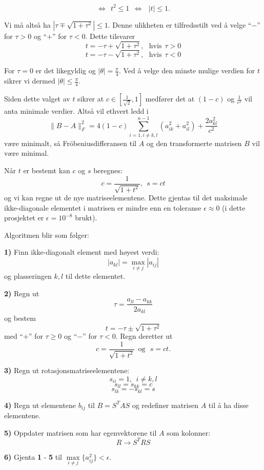 \documentclass[norsk, 12pt]{article}
\newcommand{\f}{\frac}
\begin{document}
$$\Leftrightarrow \ \ t^2\leq 1\ \  \Leftrightarrow\ \ \ |t|\leq1.$$

Vi må altså ha $|\tau\mp\sqrt{1+\tau^2}|\leq1$. Denne ulikheten er tilfredsstilt ved å velge ``$-$'' for $\tau>0$ og ``$+$'' for $\tau<0$.
Dette tilsvarer
$$t = -\tau + \sqrt{1+\tau^2},\ \ \ \text{hvis}\ \ \tau>0$$
$$t = -\tau - \sqrt{1+\tau^2},\ \ \ \text{hvis}\ \ \tau<0$$

For $\tau=0$ er det likegyldig og
$|\theta|= \f{\pi}{4}$. Ved å velge den minste mulige verdien for $t$ sikrer vi dermed $|\theta|\leq\f{\pi}{4}$.

Siden dette valget av $t$ sikrer at $c\in\left[\f{1}{\sqrt{2}}, 1\right]$ medfører det at $(1-c)$ og $\f{1}{c^2}$ vil
anta minimale verdier. Altså vil ethvert ledd i 
$$\|B-A\|_F^2=4(1-c)\sum\limits_{i=1,i\neq k,l}^{n-1}(a_{ik}^2+a_{il}^2)+\f{2a_{kl}^2}{c^2}$$
være minimalt, så Fröbeniusdifferansen til $A$ og den transformerte matrisen $B$ vil være minimal.

Når $t$ er bestemt kan $c$ og $s$ beregnes: $$c = \f{1}{\sqrt{1+t^2}},\ \ s = ct$$
og vi kan regne ut de nye matriseelementene. Dette gjentas til det maksimale ikke-diagonale elementet i matrisen
er mindre enn en toleranse $\epsilon\approx0$ (i dette prosjektet er $\epsilon=10^{-8}$ brukt).

Algoritmen blir som følger:

\textbf{1)} Finn ikke-diagonalt element med høyest verdi: $$|a_{kl}|=\max\limits_{i\neq j}|a_{ij}|$$ og plasseringen $k,l$ til
dette elementet.

\textbf{2)} Regn ut $$\tau=\f{a_{ll}-a_{kk}}{2a_{kl}}$$ og bestem $$t=-\tau\pm\sqrt{1+\tau^2}$$ med ``$+$'' for $\tau\geq0$ og ``$-$'' for 
$\tau<0$. Regn deretter ut $$c = \f{1}{\sqrt{1+t^2}}\ \  \text{og}\ \ \  s=ct.$$

\textbf{3)} Regn ut rotasjonsmatriseelementene: $$s_{ii} = 1,\ \ i\neq k,l$$
$$s_{ll} = s_{kk} = c$$
$$s_{lk}=-s_{kl} = s$$

\textbf{4)} Regn ut elementene $b_{ij}$ til $B = S^{T}AS$ og redefiner matrisen $A$ til å ha disse elementene.

\textbf{5)} Oppdater matrisen som har egenvektorene til $A$ som kolonner: $$R\rightarrow S^TRS$$

\textbf{6)} Gjenta \textbf{1} - \textbf{5} til $\max\limits_{i\neq j}\{a_{ij}^2\}<\epsilon$.
\end{document}
